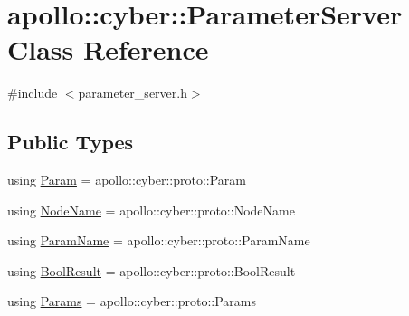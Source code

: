 \hypertarget{classapollo_1_1cyber_1_1ParameterServer}{\section{apollo\-:\-:cyber\-:\-:Parameter\-Server Class Reference}
\label{classapollo_1_1cyber_1_1ParameterServer}
}


{\ttfamily \#include $<$parameter\-\_\-server.\-h$>$}

\subsection*{Public Types}
\begin{DoxyCompactItemize}
\item 
using \hyperlink{classapollo_1_1cyber_1_1ParameterServer_aabdbb6b8047a5748cb9e4f336650e303}{Param} = apollo\-::cyber\-::proto\-::\-Param
\item 
using \hyperlink{classapollo_1_1cyber_1_1ParameterServer_ac7ab499bb218b50675bb950b500bbae8}{Node\-Name} = apollo\-::cyber\-::proto\-::\-Node\-Name
\item 
using \hyperlink{classapollo_1_1cyber_1_1ParameterServer_a9a36f8371c476a478cbce477c443aa16}{Param\-Name} = apollo\-::cyber\-::proto\-::\-Param\-Name
\item 
using \hyperlink{classapollo_1_1cyber_1_1ParameterServer_a603661a34f7d6cff05fb6cf5618b96b9}{Bool\-Result} = apollo\-::cyber\-::proto\-::\-Bool\-Result
\item 
using \hyperlink{classapollo_1_1cyber_1_1ParameterServer_adc6130bafd919f927f669737307a12d1}{Params} = apollo\-::cyber\-::proto\-::\-Params
\end{DoxyCompactItemize}
